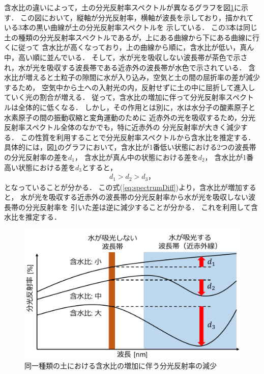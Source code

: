 含水比の違いによって，土の分光反射率スペクトルが異なるグラフを図\ref{fig:watercontent_and_spectrum_relationship}に示す．
この図において，縦軸が分光反射率，横軸が波長を示しており，描かれている3本の黒い曲線が土の分光反射率スペクトルを
示している．
この3本は同じ土の種類の分光反射率スペクトルであるが，上にある曲線から下にある曲線に行くに従って
含水比が高くなっており，上の曲線から順に，含水比が低い，真ん中，高い順に並んでいる．
そして，水が光を吸収しない波長帯が茶色で示され，水が光を吸収する波長帯である近赤外の波長帯が水色で示されている．
含水比が増えると土粒子の隙間に水が入り込み，空気と土の間の屈折率の差が減少するため，
空気中から土への入射光の内，反射せずに土の中に屈折して進入していく光の割合が増える．
従って，含水比の増加に伴って分光反射率スペクトルは全体的に低くなる．
しかし，その作用とは別に，水は水分子の酸素原子と水素原子の間の振動収縮と変角運動のために
近赤外の光を吸収するため，分光反射率スペクトル全体のなかでも，特に近赤外の %
分光反射率が大きく減少する．
この性質を利用することで分光反射率スペクトルから含水比を推定する．
具体的には，図\ref{fig:watercontent_and_spectrum_relationship}のグラフにおいて，含水比が1番低い状態における2つの波長帯の分光反射率の差を$d_1$，
含水比が真ん中の状態における差を$d_2$，
含水比が1番高い状態における差を$d_3$とすると，
\begin{eqnarray}
d_1 > d_2 > d_3， \label{eq:spectrumDiff}
\end{eqnarray}
となっていることが分かる．
この\mbox{式(\ref{eq:spectrumDiff})}より，含水比が増加すると，
水が光を吸収する近赤外の波長帯の分光反射率から水が光を吸収しない波長帯の分光反射率を
引いた差は逆に減少することが分かる．
これを利用して含水比を推定する．

\begin{figure}[b]
      \begin{center}
            \includegraphics[width=12cm]{./Ch4_WaterContentEstimation/Fig/watercontent_and_spectrum_relationship_compressed.pdf}
            \caption{同一種類の土における含水比の増加に伴う分光反射率の減少}
            \label{fig:watercontent_and_spectrum_relationship}
            \vspace{3cm}
      \end{center}
\end{figure}



